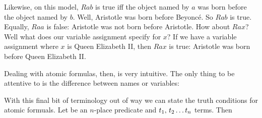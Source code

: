 
Likewise, on this model, $Rab$ is true iff the object named by $a$ was born before the object named by $b$. Well, Aristotle was born before Beyonc\'e. So $Rab$ is true. Equally, $Raa$ is false: Aristotle was not born before Aristotle. How about $Rax$? Well what does our variable assignment specify for $x$? If we have a variable assignment where $x$ is Queen Elizabeth II, then $Rax$ is true: Aristotle was born before Queen Elizabeth II.

Dealing with atomic formulas, then, is very intuitive. The only thing to be attentive to is the difference between names or variables:

With this final bit of terminology out of way we can state the truth conditions for atomic formuals. Let  be an $n$-place predicate and $t_1,\,t_2\ldots t_{n}$ terms. Then


